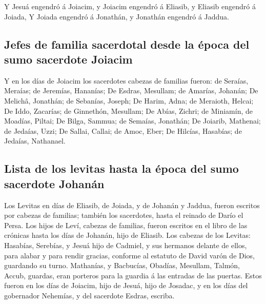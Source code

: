  Y Jesuá engendró á Joiacim, y Joiacim engendró á Eliasib,
y Eliasib engendró á Joiada,  Y Joiada engendró á Jonathán,
y Jonathán engendró á Jaddua.

\hypertarget{jefes-de-familia-sacerdotal-desde-la-uxe9poca-del-sumo-sacerdote-joiacim}{%
\subsection{Jefes de familia sacerdotal desde la época del sumo
sacerdote
Joiacim}\label{jefes-de-familia-sacerdotal-desde-la-uxe9poca-del-sumo-sacerdote-joiacim}}

 Y en los días de Joiacim los sacerdotes cabezas de
familias fueron: de Seraías, Meraías; de Jeremías, Hananías;
 De Esdras, Mesullam; de Amarías, Johanán;  De
Melichâ, Jonathán; de Sebanías, Joseph;  De Harim, Adna; de
Meraioth, Helcai;  De Iddo, Zacarías; de Ginnethón,
Mesullam;  De Abías, Zichri; de Miniamín, de Moadías,
Piltai;  De Bilga, Sammua; de Semaías, Jonathán;
 De Joiarib, Mathenai; de Jedaías, Uzzi;  De
Sallai, Callai; de Amoc, Eber;  De Hilcías, Hasabías; de
Jedaías, Nathanael.

\hypertarget{lista-de-los-levitas-hasta-la-uxe9poca-del-sumo-sacerdote-johanuxe1n}{%
\subsection{Lista de los levitas hasta la época del sumo sacerdote
Johanán}\label{lista-de-los-levitas-hasta-la-uxe9poca-del-sumo-sacerdote-johanuxe1n}}

 Los Levitas en días de Eliasib, de Joiada, y de Johanán y
Jaddua, fueron escritos por cabezas de familias; también los sacerdotes,
hasta el reinado de Darío el Persa.  Los hijos de Leví,
cabezas de familias, fueron escritos en el libro de las crónicas hasta
los días de Johanán, hijo de Eliasib.  Los cabezas de los
Levitas: Hasabías, Serebías, y Jesuá hijo de Cadmiel, y sus hermanos
delante de ellos, para alabar y para rendir gracias, conforme al
estatuto de David varón de Dios, guardando su turno. 
Mathanías, y Bacbucías, Obadías, Mesullam, Talmón, Accub, guardas, eran
porteros para la guardia á las entradas de las puertas. 
Estos fueron en los días de Joiacim, hijo de Jesuá, hijo de Josadac, y
en los días del gobernador Nehemías, y del sacerdote Esdras, escriba.

